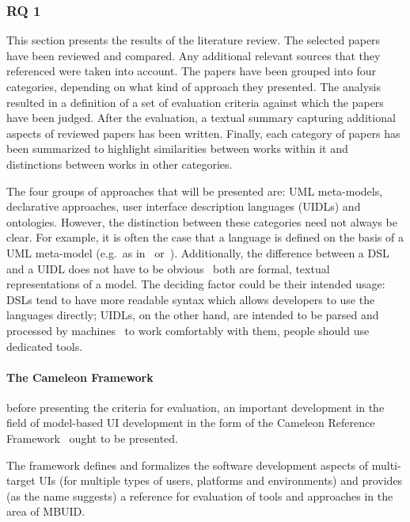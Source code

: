 \subsubsection{RQ 1}\label{subsubsec:rq-1}

This section presents the results of the literature review.
The selected papers have been reviewed and compared.
Any additional relevant sources that they referenced were taken into account.
The papers have been grouped into four categories, depending on what kind of approach they presented.
The analysis resulted in a definition of a set of evaluation criteria against which the papers have been judged.
After the evaluation, a textual summary capturing additional aspects of reviewed papers has been written.
Finally, each category of papers has been summarized to highlight similarities between works within it and distinctions between works in other categories.

The four groups of approaches that will be presented are: UML meta-models, declarative approaches, user interface description languages (UIDLs) and ontologies.
However, the distinction between these categories need not always be clear.
For example, it is often the case that a language is defined on the basis of a UML meta-model (e.g.\ as in~\cite{Karu2013-po} or~\cite{moldovan2020open}).
Additionally, the difference between a DSL and a UIDL does not have to be obvious \textemdash\ both are formal, textual representations of a model.
The deciding factor could be their intended usage: DSLs tend to have more readable syntax which allows developers to use the languages directly;
UIDLs, on the other hand, are intended to be parsed and processed by machines \textemdash\ to work comfortably with them, people should use dedicated tools.

\paragraph{The Cameleon Framework}

before presenting the criteria for evaluation, an important development in the field of model-based UI development in the form of the Cameleon Reference Framework~\cite{calvary_cameleon_framework_2002} ought to be presented.

The framework defines and formalizes the software development aspects of multi-target UIs (for multiple types of users, platforms and environments) and provides (as the name suggests) a reference for evaluation of tools and approaches in the area of MBUID\@.

